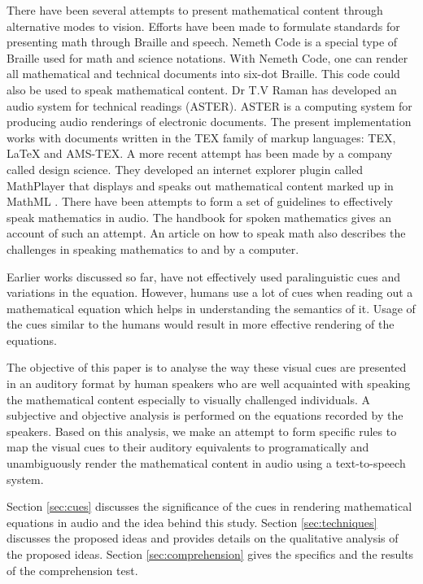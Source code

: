 \documentclass{article}
\begin{document}
There have been several attempts to present mathematical content through alternative modes to vision. Efforts have been made to formulate standards for presenting math through Braille and speech. Nemeth Code\cite{nemeth1973nemeth} is a special type of Braille used for math and science notations. With Nemeth Code, one can render all mathematical and technical documents into six-dot Braille. This code could also be used to speak mathematical content.
Dr T.V Raman has developed an audio system for technical readings (ASTER)\cite{raman1998audio}. ASTER is a computing system for producing audio renderings of electronic documents. The present implementation works with documents written in the TEX family of markup languages: TEX, LaTeX and AMS-TEX. A more recent attempt has been made by a company called design science. They developed an internet explorer plugin called MathPlayer \cite{soiffer2005mathplayer} that displays and speaks out mathematical content marked up in MathML \cite{ion1998mathematical}. There have been attempts to form a set of guidelines to effectively speak mathematics in audio. The handbook for spoken mathematics \cite{chang1983handbook} gives an account of such an attempt. An article on how to speak math \cite{fateman1998can} also describes the challenges in speaking mathematics to and by a computer.

Earlier works discussed so far, have not effectively  used paralinguistic cues and variations in the equation. However, humans use a lot of cues when reading out a mathematical equation which helps in understanding the semantics of it. Usage of the cues similar to the humans would result in more effective rendering of the equations.   

The objective of this paper is to analyse the way these visual cues are presented in an auditory format by human speakers who are well acquainted with speaking the mathematical content especially to visually challenged individuals. A subjective and objective analysis is performed on the equations recorded by the speakers. Based on this analysis, we make an attempt to form specific rules to map the visual cues to their auditory equivalents to programatically and unambiguously render the mathematical content in audio using a text-to-speech system.

Section \ref{sec:cues} discusses the  significance of the cues in rendering mathematical equations in audio and the idea behind this study.  Section \ref{sec:techniques} discusses the proposed ideas and provides details on the qualitative analysis of the proposed ideas. Section \ref{sec:comprehension} gives the specifics and the results of the comprehension test.
\end{document}
